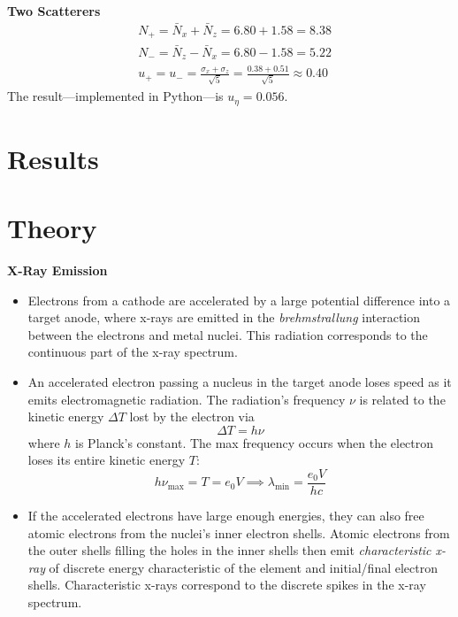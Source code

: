 \documentclass[11pt, a4paper]{article}
\begin{document}
\vspace{2mm}
\textbf{Two Scatterers}
\begin{align*}
	& N_{+} = \bar{N}_{x} + \bar{N}_{z} = 6.80 + 1.58 = 8.38  \\ 
	& N_{-} = \bar{N}_{z} - \bar{N}_{x} = 6.80 - 1.58 = 5.22  \\ 
	&u_{+} = u_{-} = \frac{\sigma_{x} + \sigma_{z}}{\sqrt{5}} = \frac{0.38 + 0.51}{\sqrt{5}} \approx 0.40
\end{align*}
The result---implemented in Python---is $ u_{\eta} = 0.056 $.






\section{Results}

\appendix

\section{Theory}

\textbf{X-Ray Emission}
\begin{itemize}
	\item Electrons from a cathode are accelerated by a large potential difference into a target anode, where x-rays are emitted in the \textit{brehmstrallung} interaction between the electrons and metal nuclei. This radiation corresponds to the continuous part of the x-ray spectrum. 
	
	\item An accelerated electron passing a nucleus in the target anode loses speed as it emits electromagnetic radiation. The radiation's frequency $ \nu $ is related to the kinetic energy $ \Delta T $ lost by the electron via
	\begin{equation*}
		\Delta T = h \nu
	\end{equation*}
	where $ h $ is Planck's constant. The max frequency occurs when the electron loses its entire kinetic energy $ T $:
	\begin{equation*}
		h \nu_{\text{max}} = T = e_{0}V \implies \lambda_{\text{min}} = \frac{e_{0}V}{hc}
	\end{equation*}
	
	\item If the accelerated electrons have large enough energies, they can also free atomic electrons from the nuclei's inner electron shells. Atomic electrons from the outer shells filling the holes in the inner shells then emit \textit{characteristic x-ray} of discrete energy characteristic of the element and initial/final electron shells. Characteristic x-rays correspond to the discrete spikes in the x-ray spectrum. 
\end{itemize}
\end{document}
